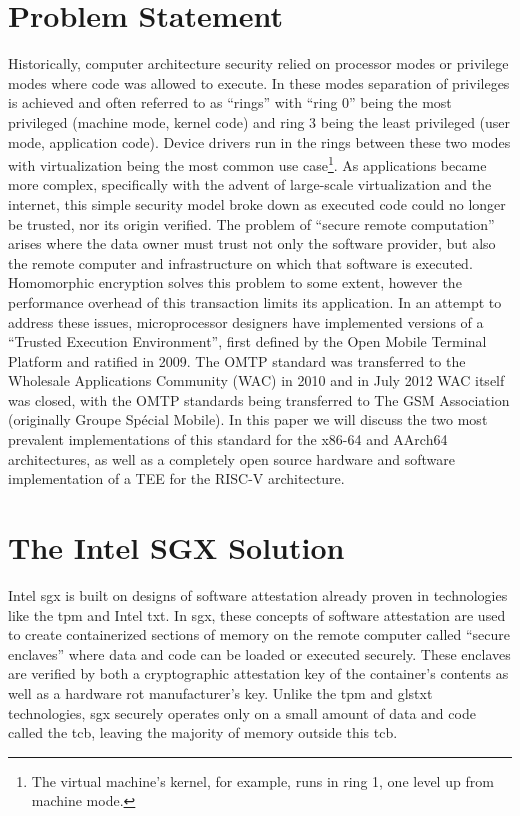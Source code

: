 \section{Problem Statement}
Historically, computer architecture security relied on processor modes or privilege modes where code was allowed to execute. In these modes separation of privileges is achieved and often referred to as “rings” with “ring 0” being the most privileged (machine mode, kernel code) and ring 3 being the least privileged (user mode, application code). Device drivers run in the rings between these two modes with virtualization being the most common use case\footnote{The virtual machine’s kernel, for example, runs in ring 1, one level up from machine mode.}. As applications became more complex, specifically with the advent of large-scale virtualization and the internet, this simple security model broke down as executed code could no longer be trusted, nor its origin verified. The problem of “secure remote computation” arises where the data owner must trust not only the software provider, but also the remote computer and infrastructure on which that software is executed. Homomorphic encryption solves this problem to some extent, however the performance overhead of this transaction limits its application\cite{Gentry01}. 
In an attempt to address these issues, microprocessor designers have implemented versions of a “Trusted Execution Environment”, first defined by the Open Mobile Terminal Platform and ratified in 2009\cite{OMTP01}. The OMTP standard was transferred to the Wholesale Applications Community (WAC) in 2010 and in July 2012 WAC itself was closed, with the OMTP standards being transferred to The GSM Association (originally Groupe Spécial Mobile)\cite{WAC}. In this paper we will discuss the two most prevalent implementations of this standard for the x86-64 and AArch64 architectures, as well as a completely open source hardware and software implementation of a TEE for the RISC-V architecture.
\section{The Intel SGX Solution}
Intel \gls{sgx} is built on designs of software attestation already proven in technologies like the \gls{tpm} and Intel \gls{txt}. In \gls{sgx}, these concepts of software attestation are used to create containerized sections of memory on the remote computer called “secure enclaves” where data and code can be loaded or executed securely. These enclaves are verified by both a cryptographic attestation key of the container’s contents as well as a hardware \gls{rot} manufacturer’s key. Unlike the \gls{tpm} and gls{txt} technologies, \gls{sgx} securely operates only on a small amount of data and code called the \gls{tcb}, leaving the majority of memory outside this \gls{tcb}.
